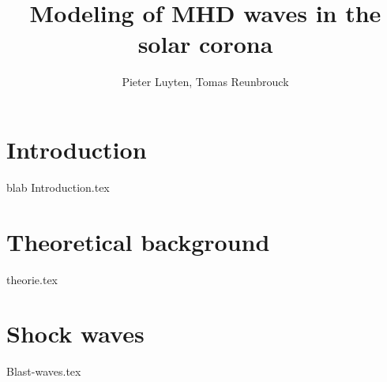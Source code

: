 \documentclass[a4paper]{article}
\title{Modeling of MHD waves in the solar corona}
\author{Pieter Luyten, Tomas Reunbrouck}
\begin{document}
\maketitle
\newpage
\tableofcontents
\newpage

\section{Introduction}
blab
{Introduction.tex}
\cite{notes-fluid-dynamics}

\section{Theoretical background}
{theorie.tex}

\section{Shock waves}
{Blast-waves.tex}

\end{document}
